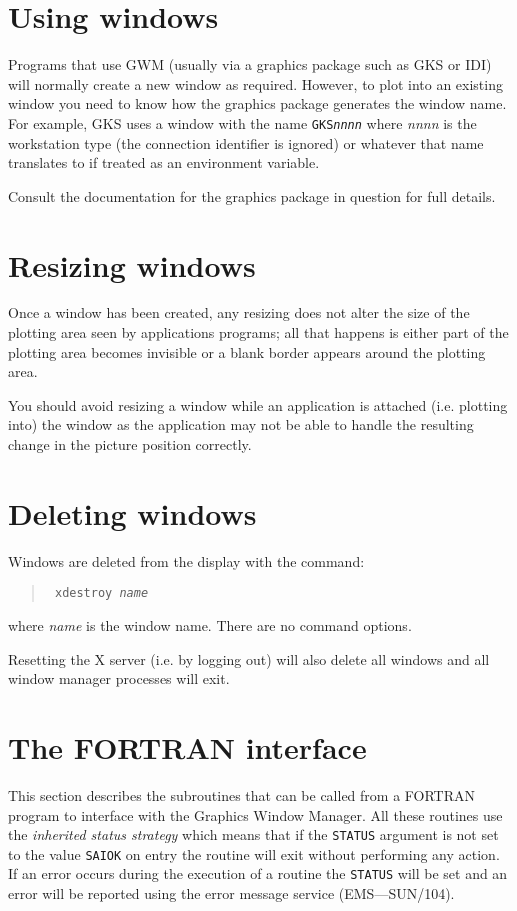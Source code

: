 \documentclass[twoside,11pt]{article}
\newcommand{\xref}[3]{#1}
\newcommand{\xlabel}[1]{}
\renewcommand{\_}{\texttt{\symbol{95}}}
\begin{document}
\section{Using windows}

Programs that use GWM (usually via a graphics package such as GKS or IDI) will
normally create a new window as required. However, to plot into an existing
window you need to know how the graphics package generates the window name. For
example, GKS  uses a window with the name {\tt GKS\_{\em{nnnn}}} where {\em
nnnn} is the workstation type (the connection identifier is ignored) or
whatever that name translates to if treated as an environment variable.

Consult the documentation for the graphics package in question for full
details.

\section{Resizing windows}
Once a window has been created, any resizing does not alter the size of the
plotting area seen by applications programs; all that happens is either part of
the plotting area becomes invisible or a blank border appears around the
plotting area.

You should avoid resizing a window while an application is attached (i.e.
plotting into) the window as the application may not be able to handle the
resulting change in the picture position correctly.

\section{Deleting windows\xlabel{xdestroyCommand}}
Windows are deleted from the display with the command:
\begin{quote}{\tt
xdestroy {\em name}}
\end{quote}
where {\em name} is the window name. There are no command options.

Resetting the X server (i.e. by logging out) will also delete all windows 
and all window manager processes will exit.

\section{The FORTRAN interface}

This section describes the subroutines that can be called from a FORTRAN
program to interface with the Graphics Window Manager. All these routines
use the {\em inherited status strategy} which means that if the {\tt STATUS}
argument is not set to the value {\tt SAI\_\_OK} on entry the routine will
exit without performing any action. If an error occurs during the execution
of a routine the {\tt STATUS} will be set and an error will be reported
using the error message service 
(EMS---\xref{SUN/104}{sun104}{}).
\end{document}
